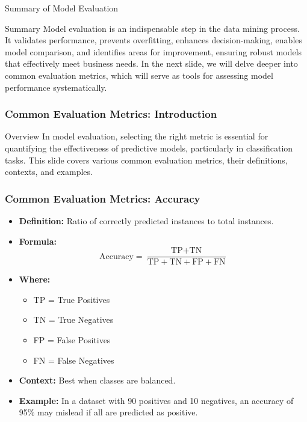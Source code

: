 \documentclass[aspectratio=169]{beamer}
\begin{document}
\begin{frame}[fragile]{Summary of Model Evaluation}
    \begin{block}{Summary}
       Model evaluation is an indispensable step in the data mining process. It validates performance, prevents overfitting, enhances decision-making, enables model comparison, and identifies areas for improvement, ensuring robust models that effectively meet business needs. In the next slide, we will delve deeper into common evaluation metrics, which will serve as tools for assessing model performance systematically.
    \end{block}
\end{frame}

\begin{frame}[fragile]
    \frametitle{Common Evaluation Metrics: Introduction}
    \begin{block}{Overview}
        In model evaluation, selecting the right metric is essential for quantifying the effectiveness of predictive models, particularly in classification tasks. This slide covers various common evaluation metrics, their definitions, contexts, and examples.
    \end{block}
\end{frame}

\begin{frame}[fragile]
    \frametitle{Common Evaluation Metrics: Accuracy}
    \begin{itemize}
        \item \textbf{Definition:} Ratio of correctly predicted instances to total instances.
        \item \textbf{Formula:}
        \begin{equation}
            \text{Accuracy} = \frac{\text{TP} + \text{TN}}{\text{TP} + \text{TN} + \text{FP} + \text{FN}}
        \end{equation}
        \item \textbf{Where:}
        \begin{itemize}
            \item TP = True Positives
            \item TN = True Negatives
            \item FP = False Positives
            \item FN = False Negatives
        \end{itemize}
        \item \textbf{Context:} Best when classes are balanced.
        \item \textbf{Example:} In a dataset with 90 positives and 10 negatives, an accuracy of 95\% may mislead if all are predicted as positive.
    \end{itemize}
\end{frame}
\end{document}
